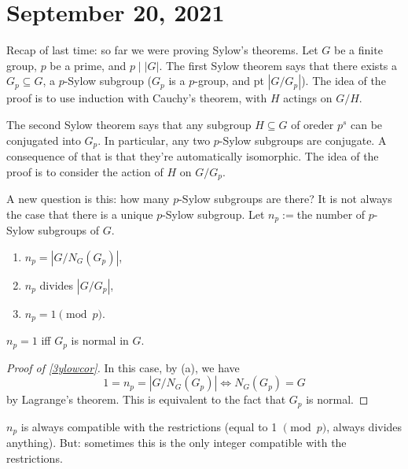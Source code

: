 \section{September 20, 2021} 
Recap of last time: so far we were proving Sylow's theorems. Let $G$ be a finite group, $p$ be a prime, and $p \mid  |G|$. The first Sylow theorem says that there exists a $G_p \subseteq G$, a $p$-Sylow subgroup ($G_p$ is a $p$-group, and pt $|G / G_p|$). The idea of the proof is to use induction with Cauchy's theorem, with $H$ actings on $G /H$.

The second Sylow theorem says that any subgroup $H \subseteq G$ of oreder $p^s$ can be conjugated into $G_p$. In particular, any two $p$-Sylow subgroups are conjugate. A consequence of that is that they're automatically isomorphic. The idea of the proof is to consider the action of $H$ on $G /G_p$.

A new question is this: how many $p$-Sylow subgroups are there? It is not always the case that there is a unique $p$-Sylow subgroup. Let $n_p:=$the number of $p$-Sylow subgroups of $G$. 
\begin{theorem}\label{sylow3} 
   \hspace{0.2cm} 

   \begin{enumerate}[label=(\alph*)]
   \setlength\itemsep{-.2em}
       \item $n_p= |G / N_G (G_p)|$,
        \item $n_p$ divides $|G / G_p|$,
        \item $n_p=1\pmod p$.
   \end{enumerate}
\end{theorem}
\begin{cor}\label{3ylowcor} 
    $n_p=1$ iff $G_p$ is normal in $G$.
\end{cor}
\begin{proof}[Proof of \cref{3ylowcor}]
    In this case, by (a), we have \[
        1=n_p=|G /N_G (G_p)| \iff N_G(G_p)=G
    \] by Lagrange's theorem. This is equivalent to the fact that $G_p$ is normal.
\end{proof}
$n_p$ is always compatible with the restrictions (equal to 1 $\pmod p$, always divides anything). But: sometimes this is the only integer compatible with the restrictions.

